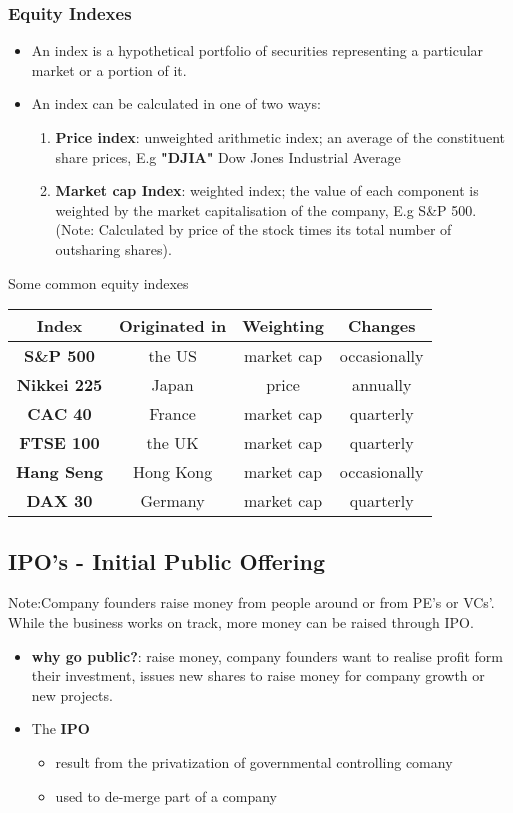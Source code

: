 \documentclass{article}
\theoremstyle{definition}
\theoremstyle{thrm}
\theoremstyle{lma}
\theoremstyle{ppst}
\theoremstyle{crlr}
\begin{document}
\subsubsection{Equity Indexes}
\begin{itemize}
	\item An index is a hypothetical portfolio of securities representing a particular market or a portion of it.
	\item An index can be calculated in one of two ways:
	\begin{enumerate}
		\item \textbf{Price index}: unweighted arithmetic index; an average of the constituent share prices, E.g \textbf{"DJIA"} Dow Jones Industrial Average
		\item \textbf{Market cap Index}: weighted index; the value of each component is weighted by the market capitalisation of the company, E.g S\&P 500.(Note: Calculated by price of the stock times its total number of outsharing shares).
	\end{enumerate}
\end{itemize}
Some common equity indexes\\
\begin{center}
	\begin{tabular}{|c| c | c |c|}
	\hline
	Index & Originated in & Weighting & Changes\\
	\hline
	\textbf{S\&P 500}   &  the US  &  market cap  &  occasionally \\
	\hline
	\textbf{Nikkei 225}   &  Japan  &  price  &  annually \\
	\hline
	\textbf{CAC 40}   &  France  &  market cap  &  quarterly \\
	\hline
	\textbf{FTSE 100}   &  the UK  &  market cap  &  quarterly \\
	\hline
	\textbf{Hang Seng}   &  Hong Kong  &  market cap  &  occasionally \\
	\hline
	\textbf{DAX 30}   &  Germany  &  market cap  &  quarterly \\
	\hline
	\end{tabular}
\end{center}

\subsection{IPO's - Initial Public Offering}
Note:Company founders raise money from people around or from PE's or VCs'. While the business works on track, more money can be raised through IPO.
\begin{itemize}
	\item \textbf{why go public?}: raise money, company founders want to realise profit form their investment, issues new shares to raise money for company growth or new projects.
	\item The \textbf{IPO} 
	\begin{itemize}
		\item result from the privatization of governmental controlling comany
		\item used to de-merge part of a company 
	\end{itemize}
\end{itemize}
\end{document}
